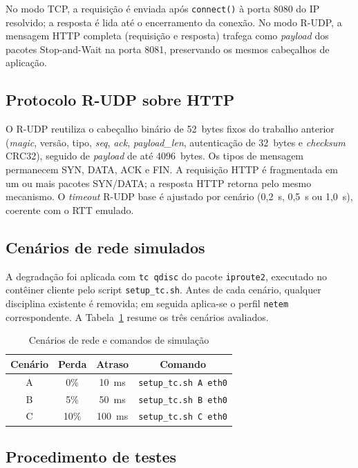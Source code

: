 \documentclass[12pt]{article}
\begin{document}
No modo TCP, a requisição é enviada após \texttt{connect()} à porta 8080 do IP
resolvido; a resposta é lida até o encerramento da conexão. No modo R-UDP, a
mensagem HTTP completa (requisição e resposta) trafega como \emph{payload} dos
pacotes Stop-and-Wait na porta 8081, preservando os mesmos cabeçalhos de
aplicação.

\subsection{Protocolo R-UDP sobre HTTP}

O R-UDP reutiliza o cabeçalho binário de 52~bytes fixos do trabalho anterior
(\emph{magic}, versão, tipo, \emph{seq}, \emph{ack}, \emph{payload\_len},
autenticação de 32~bytes e \emph{checksum} CRC32), seguido de \emph{payload} de
até 4096~bytes. Os tipos de mensagem permanecem SYN, DATA, ACK e FIN. A
requisição HTTP é fragmentada em um ou mais pacotes SYN/DATA; a resposta HTTP
retorna pelo mesmo mecanismo. O \emph{timeout} R-UDP base é ajustado por cenário
(0,2~s, 0,5~s ou 1,0~s), coerente com o RTT emulado.

\subsection{Cenários de rede simulados}

A degradação foi aplicada com \texttt{tc qdisc} do pacote \texttt{iproute2},
executado no contêiner cliente pelo script \texttt{setup\_tc.sh}. Antes de cada
cenário, qualquer disciplina existente é removida; em seguida aplica-se o perfil
\texttt{netem} correspondente. A Tabela~\ref{tab:cenarios} resume os três
cenários avaliados.

\begin{table}[!htb]
  \centering
  \caption{Cenários de rede e comandos de simulação}
  \label{tab:cenarios}
  \begin{tabular}{cccc}
    \toprule
    Cenário & Perda & Atraso & Comando \\
    \midrule
    A & 0\%  & 10~ms  & \texttt{setup\_tc.sh A eth0} \\
    B & 5\%  & 50~ms  & \texttt{setup\_tc.sh B eth0} \\
    C & 10\% & 100~ms & \texttt{setup\_tc.sh C eth0} \\
    \bottomrule
  \end{tabular}
\end{table}

\subsection{Procedimento de testes}
\end{document}
